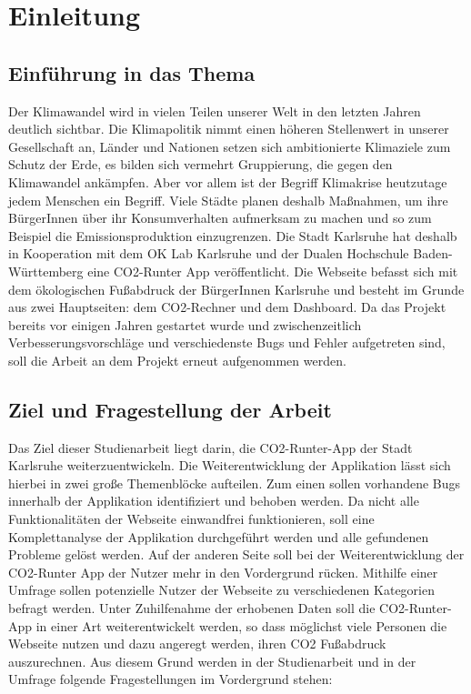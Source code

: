 
\chapter{Einleitung}
\label{chapter:1}

\section{Einführung in das Thema}

Der Klimawandel wird in vielen Teilen unserer Welt in den letzten Jahren deutlich sichtbar.
Die Klimapolitik nimmt einen höheren Stellenwert in unserer Gesellschaft an, Länder und Nationen setzen sich ambitionierte Klimaziele zum Schutz der Erde, es bilden sich vermehrt Gruppierung, die gegen den Klimawandel ankämpfen. Aber vor allem ist der Begriff Klimakrise heutzutage jedem Menschen ein Begriff. Viele Städte planen deshalb Maßnahmen, um ihre BürgerInnen über ihr Konsumverhalten aufmerksam zu machen und so zum Beispiel die Emissionsproduktion einzugrenzen.  Die Stadt Karlsruhe hat deshalb in Kooperation mit dem OK Lab Karlsruhe und der Dualen Hochschule Baden-Württemberg eine CO2-Runter App veröffentlicht. Die Webseite befasst sich mit dem ökologischen Fußabdruck der BürgerInnen Karlsruhe und besteht im Grunde aus zwei Hauptseiten: dem CO2-Rechner und dem Dashboard. Da das Projekt bereits vor einigen Jahren gestartet wurde und zwischenzeitlich Verbesserungsvorschläge und verschiedenste Bugs und Fehler aufgetreten sind, soll die Arbeit an dem Projekt erneut aufgenommen werden.

\section{Ziel und Fragestellung der Arbeit}

Das Ziel dieser Studienarbeit liegt darin, die CO2-Runter-App der Stadt Karlsruhe weiterzuentwickeln. Die Weiterentwicklung der Applikation lässt sich hierbei in zwei große Themenblöcke aufteilen. Zum einen sollen vorhandene Bugs innerhalb der Applikation identifiziert und behoben werden. Da nicht alle Funktionalitäten der Webseite einwandfrei funktionieren, soll eine Komplettanalyse der Applikation durchgeführt werden und alle gefundenen Probleme gelöst werden. Auf der anderen Seite soll bei der Weiterentwicklung der CO2-Runter App der Nutzer mehr in den Vordergrund rücken. Mithilfe einer Umfrage sollen potenzielle Nutzer der Webseite zu verschiedenen Kategorien befragt werden. Unter Zuhilfenahme der erhobenen Daten soll die CO2-Runter-App in einer Art weiterentwickelt werden, so dass möglichst viele Personen die Webseite nutzen und dazu angeregt werden, ihren CO2 Fußabdruck auszurechnen. Aus diesem Grund werden in der Studienarbeit und in der Umfrage folgende Fragestellungen im Vordergrund stehen:

